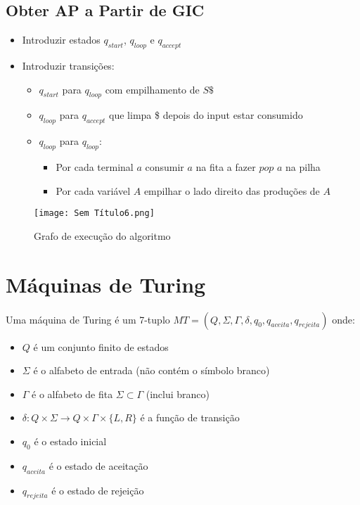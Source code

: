 \documentclass[10pt,a4paper]{report}
\begin{document}
\subsection{Obter AP a Partir de GIC}
\begin{itemize}
\item Introduzir estados $q_{start}$, $q_{loop}$ e $q_{accept}$
\item Introduzir transições:
\begin{itemize}
\item $q_{start}$ para $q_{loop}$ com empilhamento de $S\$$
\item $q_{loop}$ para $q_{accept}$ que limpa \$ depois do input estar consumido
\item $q_{loop}$ para $q_{loop}$:
\begin{itemize}
\item Por cada terminal $a$ consumir $a$ na fita a fazer $pop$ $a$ na pilha
\item Por cada variável $A$ empilhar o lado direito das produções de $A$
\end{itemize}
\end{itemize}
\end{itemize}
\begin{figure}[H]
\centering
\texttt{[image: Sem Título6.png]}
\caption{Grafo de execução do algoritmo}
\end{figure}

\section{Máquinas de Turing}
Uma máquina de Turing é um 7-tuplo $MT = (Q, \Sigma, \Gamma, \delta, q_0, q_{aceita}, q_{rejeita})$ onde:
\begin{itemize}
\item $Q$ é um conjunto finito de estados
\item $\Sigma$ é o alfabeto de entrada (não contém o símbolo branco)
\item $\Gamma$ é o alfabeto de fita $\Sigma \subset \Gamma$ (inclui branco)
\item $\delta: Q \times \Sigma \rightarrow Q \times \Gamma \times \{L,R\}$  é a função de transição
\item $q_0$ é o estado inicial
\item $q_{aceita}$ é o estado de aceitação
\item $q_{rejeita}$ é o estado de rejeição
\end{itemize}
\end{document}
